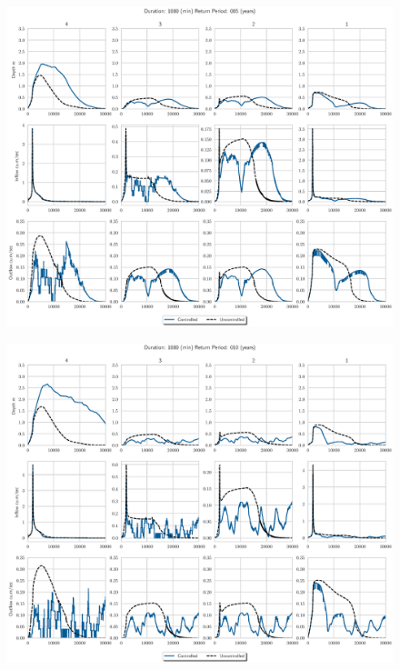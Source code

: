 \begin{figure}
    \centering
    \includegraphics[width=\linewidth]{./RL-SI-figures/77storms/1080005.eps}
\end{figure}
\begin{figure}
    \centering
    \includegraphics[width=\linewidth]{./RL-SI-figures/77storms/1080010.eps}
\end{figure}
